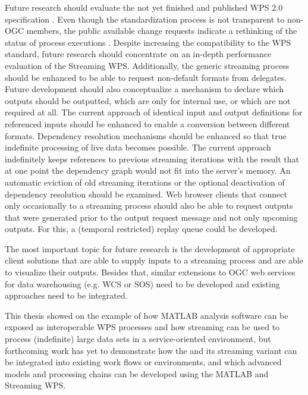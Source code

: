 Future research should evaluate the not yet finished and published WPS 2.0 specification \citep{ogc:wps2swg}. Even though the standardization process is not transparent to non-OGC members, the public available change requests indicate a rethinking of the status of process executions \citep[e.g. ][]{ogc:wps:cr109}. Despite increasing the compatibility to the WPS standard, future research should concentrate on an in-depth performance evaluation of the Streaming WPS. Additionally, the generic streaming process should be enhanced to be able to request non-default formats from delegates. Future development should also conceptualize a mechanism to declare which outputs should be outputted, which are only for internal use, or which are not required at all. The current approach of identical input and output definitions for referenced inputs should be enhanced to enable a conversion between different formats. Dependency resolution mechanisms should be enhanced so that true indefinite processing of live data becomes possible. The current approach indefinitely keeps references to previous streaming iterations with the result that at one point the dependency graph would not fit into the server's memory. An automatic eviction of old streaming iterations or the optional deactivation of dependency resolution should be examined. Web browser clients that connect only occasionally to a streaming process should also be able to request outputs that were generated prior to the output request message and not only upcoming outputs. For this, a (temporal restricted) replay queue could be developed.

The most important topic for future research is the development of appropriate client solutions that are able to supply inputs to a streaming process and are able to visualize their outputs. Besides that, similar extensions to OGC web services for data warehousing (e.g. \ac{WCS} or \ac{SOS}) need to be developed and existing approaches \citep[e.g. for the \ac{WFS}, see ][]{aydin2006streaming} need to be integrated.

This thesis showed on the example of \la how MATLAB analysis software can be exposed as interoperable WPS processes and how streaming can be used to process (indefinite) large data sets in a service-oriented environment, but forthcoming work has yet to demonstrate how the \la and its streaming variant can be integrated into existing work flows or environments, and which advanced models and processing chains can be developed using the MATLAB and Streaming WPS.
